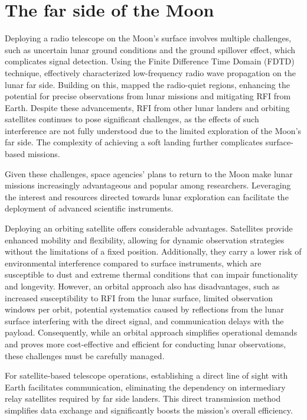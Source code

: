 \documentclass[fleqn,usenatbib]{rasti}
\begin{document}
\section{The far side of the Moon}

Deploying a radio telescope on the Moon's surface involves multiple challenges, such as uncertain lunar ground conditions and the ground spillover effect, which complicates signal detection. Using the Finite Difference Time Domain (FDTD) technique, \cite{Bassett2020} effectively characterized low-frequency radio wave propagation on the lunar far side. Building on this, \cite{burns2021} mapped the radio-quiet regions, enhancing the potential for precise observations from lunar missions and mitigating RFI from Earth. Despite these advancements, RFI from other lunar landers and orbiting satellites continues to pose significant challenges, as the effects of such interference are not fully understood due to the limited exploration of the Moon’s far side. The complexity of achieving a soft landing further complicates surface-based missions.

Given these challenges, space agencies' plans to return to the Moon make lunar missions increasingly advantageous and popular among researchers. Leveraging the interest and resources directed towards lunar exploration can facilitate the deployment of advanced scientific instruments.

Deploying an orbiting satellite offers considerable advantages. Satellites provide enhanced mobility and flexibility, allowing for dynamic observation strategies without the limitations of a fixed position. Additionally, they carry a lower risk of environmental interference compared to surface instruments, which are susceptible to dust and extreme thermal conditions that can impair functionality and longevity. However, an orbital approach also has disadvantages, such as increased susceptibility to RFI from the lunar surface, limited observation windows per orbit, potential systematics caused by reflections from the lunar surface interfering with the direct signal, and communication delays with the payload. Consequently, while an orbital approach simplifies operational demands and proves more cost-effective and efficient for conducting lunar observations, these challenges must be carefully managed.

For satellite-based telescope operations, establishing a direct line of sight with Earth facilitates communication, eliminating the dependency on intermediary relay satellites required by far side landers. This direct transmission method simplifies data exchange and significantly boosts the mission's overall efficiency.
\end{document}
